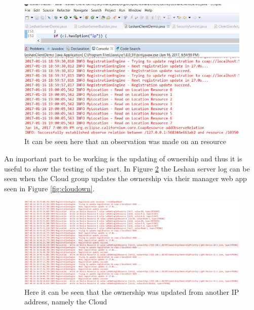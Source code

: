 \begin{figure}[h]
	\begin{center}
		\includegraphics[width=\linewidth]{img/screenshot-observe}
		\caption{It can be seen here that an observation was made on an resource}
		\label{fig:observe}
	\end{center}
\end{figure}

An important part to be working is the updating of ownership and thus it is useful to show the testing of the part. In Figure \ref{fig:own} the Leshan server log can be seen when the Cloud group updates the ownership via their manager web app seen in Figure \ref{fig:cloudown}.

\begin{figure}[h]
	\begin{center}
		\includegraphics[width=1.18\linewidth]{img/screenshot-ownership}
		\caption{Here it can be seen that the ownership was updated from another IP address, namely the Cloud}
		\label{fig:own}
	\end{center}
\end{figure}

